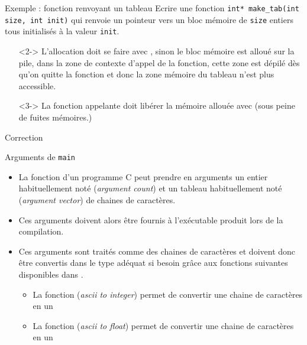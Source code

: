 \documentclass[10pt]{beamer}
\begin{document}
\begin{frame}[fragile]{\Ctitle}{\stitle}
	\begin{exampleblock}{Exemple : fonction renvoyant un \og{}tableau\fg{}}
		Ecrire une fonction \texttt{int* make_tab(int size, int init)} qui renvoie un pointeur vers un bloc mémoire de {\tt size} entiers tous initialisés à la valeur {\tt init}.
		\begin{itemize}
			\item[\textcolor{BrickRed}{\small \danger}]<2->  L'allocation \textcolor{BrickRed}{doit} se faire avec , sinon le bloc mémoire est alloué sur la pile, dans la zone de contexte d'appel de la fonction, cette zone est dépilé dès qu'on quitte la fonction et donc la zone mémoire du tableau n'est plus accessible.
			\item[\textcolor{BrickRed}{\small \danger}]<3-> La fonction appelante doit libérer la mémoire allouée avec  (sous peine de fuites mémoires.)
		\end{itemize}
	\end{exampleblock}
\end{frame}

\begin{frame}[fragile]{\Ctitle}{\stitle}
	\begin{exampleblock}{Correction}
	\end{exampleblock}
\end{frame}

\begin{frame}{\Ctitle}{\stitle}
	\begin{block}{Arguments de {\tt main}}
		\begin{itemize}
			\item<1-> La fonction  d'un programme C peut prendre en arguments un entier habituellement noté  (\textit{argument count}) et un tableau habituellement noté  (\textit{argument vector}) de chaines de caractères.
			\item<2-> Ces arguments doivent alors être fournis à l'exécutable produit lors de la compilation.
			\item<3-> Ces arguments sont traités comme des chaines de caractères et doivent donc être convertis dans le type adéquat si besoin grâce aux fonctions suivantes disponibles dans .
				\begin{itemize}
					\item<4-> La fonction  (\textit{{\sc ascii} to integer}) permet de convertir une chaine de caractères en un 
					\item<5-> La fonction  (\textit{{\sc ascii} to float}) permet de convertir une chaine de caractères en un 
				\end{itemize}

		\end{itemize}
	\end{block}
\end{frame}
\end{document}
